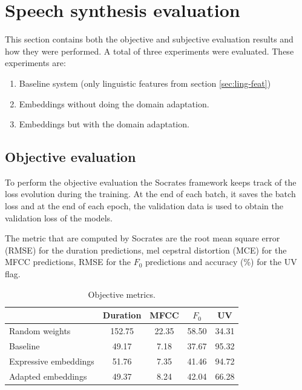 \section{Speech synthesis evaluation}

This section contains both the objective and subjective evaluation results and how they were performed. A total of three experiments were evaluated. These experiments are:

\begin{enumerate}
    \item Baseline system (only linguistic features from section \ref{sec:ling-feat})
    \item Embeddings without doing the domain adaptation.
    \item Embeddings but with the domain adaptation.
\end{enumerate}

\subsection{Objective evaluation}

To perform the objective evaluation the Socrates framework keeps track of the loss evolution during the training. At the end of each batch, it saves the batch loss and at the end of each epoch, the validation data is used to obtain the validation loss of the models.

The metric that are computed by Socrates are the root mean square error (RMSE) for the duration predictions, mel cepstral distortion \cite{mashimo2001evaluation} (MCE) for the MFCC predictions, RMSE for the $F_0$ predictions and accuracy (\%) for the UV flag. 

\begin{table}[h]
    \centering
    \begin{tabular}{|l|c|c|c|c|}
        \hline
                     & Duration &  MFCC & $F_0$ & UV \\
        \hline
        Random weights  & 152.75   & 22.35 & 58.50 & 34.31 \\
        Baseline     & 49.17    & 7.18  & 37.67 & 95.32 \\
        Expressive embeddings     & 51.76    & 7.35  & 41.46 & 94.72 \\
        Adapted embeddings     & 49.37    & 8.24  & 42.04 & 66.28 \\
        \hline
    \end{tabular}
    \caption{Objective metrics.}
\end{table}

